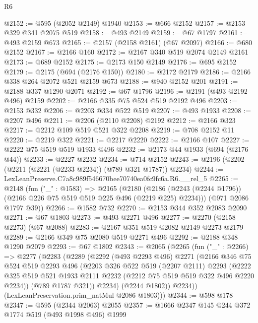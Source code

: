 \begin{lexlean}{R6}
\begin{coremodule}
@2152 := @595 (@2052 @2149) @1940
@2153 := @666 @2152
@2157 := @2153 @329 @341 @2075 @519
@2158 := @493 @2149
@2159 := @67 @1797
@2161 := @493 @2159 @673
@2165 := @2157 (@2158 @2161) (@67 @2097)
@2166 := @680 @2152
@2167 := @2166 @160
@2172 := @2167 @340 @519 @2074 @2149 @2161
@2173 := @689 @2152
@2175 := @2173 @150 @2149
@2176 := @695 @2152
@2179 := @2175 (@694 (@2176 @150))
@2180 := @2172 @2179
@2186 := @2166 @338 @264 @2072 @521 @2159 @673
@2188 := @940 @2152 @201
@2191 := @2188 @337 @1290 @2071
@2192 := @67 @1796
@2196 := @2191 (@493 @2192 @496) @2159
@2202 := @2166 @335 @75 @524 @519 @2192 @496
@2203 := @2153 @332
@2206 := @2203 @334 @522 @519
@2207 := @493 @1933
@2208 := @2207 @496
@2211 := @2206 (@2110 @2208) @2192
@2212 := @2166 @323
@2217 := @2212 @109 @519 @521 @322 @2208
@2219 := @708 @2152 @11
@2220 := @2219 @322
@2221 := @2217 @2220
@2222 := @2166 @107
@2227 := @2222 @75 @519 @519 @1933 @496
@2232 := @2173 @44 @1933 (@694 (@2176 @44))
@2233 := @2227 @2232
@2234 := @714 @2152
@2243 := @2196 (@2202 (@2211 (@2221 (@2233 @2234)) (@789 @321 @1787)) @2234)
@2244 := LexLeanPreserve.C7a8c989f546670bee70740ea0fc9fc6a.R6.__rel_5
@2265 := @2148
    (fun ("_" : @1583) =>
    @2165
      (@2180 (@2186 (@2243 (@2244 @1796)) (@2166 @226 @75 @519 @519 @225 @496 (@2219 @225) @2234)))
      (@971 @2086 @1797 @39))
@2266 := @1582 @732
@2270 := @2153 @344 @352 @2083 @2090
@2271 := @67 @1803
@2273 := @493 @2271 @496
@2277 := @2270 (@2158 @2273) (@67 @2088)
@2283 := @2167 @351 @519 @2082 @2149 @2273 @2179
@2289 := @2166 @349 @75 @2080 @519 @2271 @496
@2292 := @2188 @348 @1290 @2079
@2293 := @67 @1802
@2343 := @2065
    (@2265
      (fun ("_" : @2266) =>
      @2277
        (@2283
          (@2289
            (@2292
              (@493 @2293 @496)
              @2271
              (@2166
                @346
                @75
                @524
                @519
                @2293
                @496
                (@2203
                  @326
                  @522
                  @519
                  (@2207 @2111)
                  @2293
                  (@2222
                    @325
                    @519
                    @521
                    @1933
                    @2111
                    @2232
                    (@2212 @75 @519 @519 @322 @496 @2220 @2234))
                  (@789 @1787 @321))
                @2234)
              (@2244 @1802))
            @2234))
        (LexLeanPreservation.prim_natMul @2086 @1803)))
@2344 := @598 @178
@2347 := @595 (@2344 @2063) @2055
@2357 := @1666 @2347 @145 @244 @372 @1774 @519 (@493 @1998 @496) @1999

\end{coremodule}
\end{lexlean}
